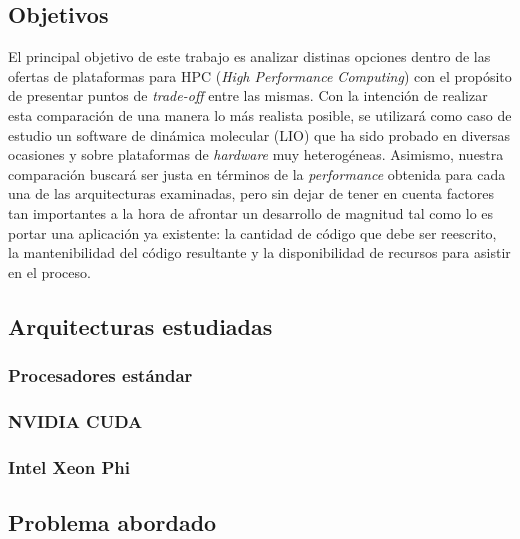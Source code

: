 \subsection{Objetivos}

El principal objetivo de este trabajo es analizar distinas opciones dentro de
las ofertas de plataformas para HPC (\textit{High Performance Computing}) con
el propósito de presentar puntos de \textit{trade-off} entre las mismas. Con la
intención de realizar esta comparación de una manera lo más realista posible,
se utilizará como caso de estudio un software de dinámica molecular (LIO) que
ha sido probado en diversas ocasiones y sobre plataformas de \textit{hardware}
muy heterogéneas. Asimismo, nuestra comparación buscará ser justa en términos
de la \textit{performance} obtenida para cada una de las arquitecturas
examinadas, pero sin dejar de tener en cuenta factores tan importantes a la
hora de afrontar un desarrollo de magnitud tal como lo es portar una
aplicación ya existente: la cantidad de código que debe ser reescrito, la
mantenibilidad del código resultante y la disponibilidad de recursos para
asistir en el proceso.

\subsection{Arquitecturas estudiadas}

\subsubsection{Procesadores est\'andar}



\subsubsection{NVIDIA CUDA}



\subsubsection{Intel Xeon Phi}



\subsection{Problema abordado}


